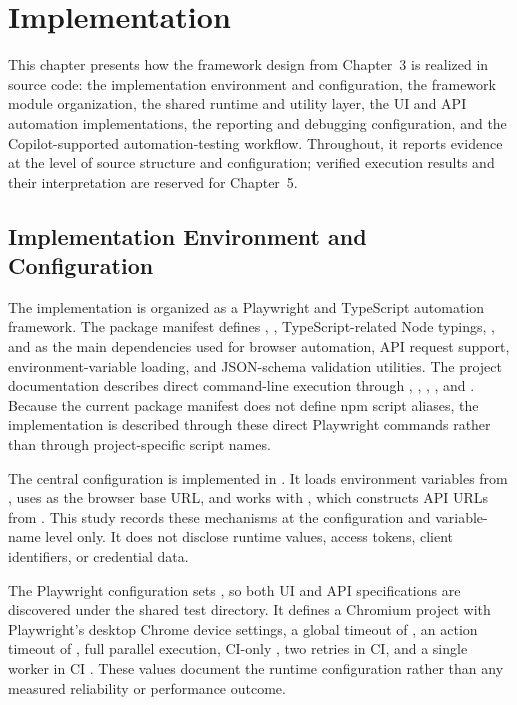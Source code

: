 \chapter{Implementation}
\label{ch:implementation}
\begingroup
\sloppy
\setlength{\emergencystretch}{3em}

This chapter presents how the framework design from Chapter~3 is realized in source code: the implementation environment and configuration, the framework module organization, the shared runtime and utility layer, the UI and API automation implementations, the reporting and debugging configuration, and the Copilot-supported automation-testing workflow. Throughout, it reports evidence at the level of source structure and configuration; verified execution results and their interpretation are reserved for Chapter~5.

\section{Implementation Environment and Configuration}
\label{sec:ch4-implementation-environment-configuration}

The implementation is organized as a Playwright and TypeScript automation framework. The package manifest defines , , TypeScript-related Node typings, , and  as the main dependencies used for browser automation, API request support, environment-variable loading, and JSON-schema validation utilities. The project documentation describes direct command-line execution through , , , , and . Because the current package manifest does not define npm script aliases, the implementation is described through these direct Playwright commands rather than through project-specific script names.

The central configuration is implemented in . It loads environment variables from , uses  as the browser base URL, and works with , which constructs API URLs from . This study records these mechanisms at the configuration and variable-name level only. It does not disclose runtime values, access tokens, client identifiers, or credential data.

The Playwright configuration sets , so both UI and API specifications are discovered under the shared test directory. It defines a Chromium project with Playwright's desktop Chrome device settings, a global timeout of , an action timeout of , full parallel execution, CI-only , two retries in CI, and a single worker in CI \autocite{playwright_docs_configuration_2026}. These values document the runtime configuration rather than any measured reliability or performance outcome.

